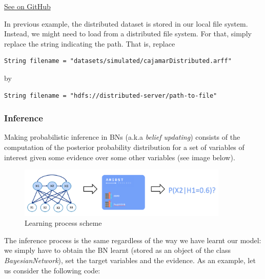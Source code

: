\documentclass[10pt,a4paper]{article}
\begin{document}
\href{https://github.com/amidst/tutorial/blob/master/src/main/java/eu/amidst/tutorial/usingAmidst/examples/StaticModelFlink.java}{See on GitHub}
\vspace{3mm}


In previous example, the distributed dataset is stored in our local file system. Instead, we might need to load from a distributed file system. For that, simply replace the string indicating the path. That is, replace


\begin{verbatim}
String filename = "datasets/simulated/cajamarDistributed.arff"
\end{verbatim}


\noindent by


\begin{verbatim}
String filename = "hdfs://distributed-server/path-to-file"
\end{verbatim}



\subsubsection{Inference}\label{sec:lvmodels:static:inference}



Making probabilistic inference in BNs (a.k.a \textit{belief updating}) consists of the computation of the posterior probability distribution for a set of variables of interest given some evidence over some other variables (see image below). 


\begin{figure}[h!]
	\centering
	\includegraphics[width=10cm]{img/staticinference.png}
	\caption{Learning process scheme}
	\label{fig:lvmodels:static:inference:scheme}	
\end{figure}

The inference process is the same regardless of the way we have learnt our model: we simply have to obtain the BN learnt (stored as an object of the class \textit{BayesianNetwork}), set the target variables and the evidence. As an example, let us consider the following code:
\end{document}

